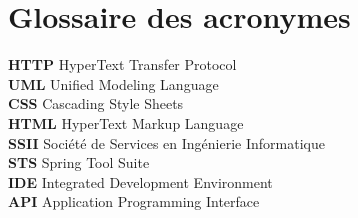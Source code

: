 \chapter*{Glossaire des acronymes }

\adjustmtc
\thispagestyle{plain}

   \textbf{HTTP}   \hspace{8mm}  HyperText Transfer Protocol     \\
  \hspace{4mm}  \textbf{UML}   \hspace{10mm}     Unified Modeling Language  \\
\hspace{4mm}  \textbf{CSS}   \hspace{12mm}     Cascading Style Sheets 
  \\
\hspace{4mm}  \textbf{HTML 
}   \hspace{5mm}     HyperText Markup Language  
  \\
\hspace{4mm}  \textbf{SSII 
}   \hspace{11mm}     Société de Services en Ingénierie Informatique 
  \\
\hspace{4mm}  \textbf{STS 
}   \hspace{11mm}     Spring Tool Suite
  \\
\hspace{4mm}  \textbf{IDE }   \hspace{11mm}     Integrated Development Environment
  \\
\hspace{4mm}  \textbf{API }   \hspace{11mm}     
Application Programming Interface


